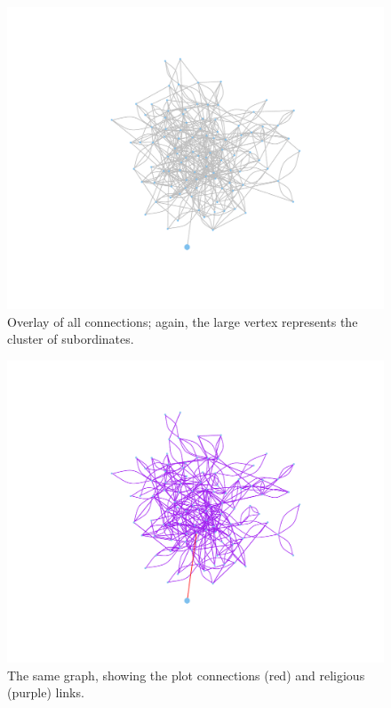 \documentclass{article}
\newenvironment{rnwfig}[0]{\begin{figure}\begin{center}}{\end{center}\end{figure}}
\begin{document}
\begin{rnwfig}
\includegraphics{manuscript-allAlt}
\caption{Overlay of all connections; again, the large vertex represents the cluster of subordinates.}
\end{rnwfig}

\begin{rnwfig}
\includegraphics{manuscript-religionAlt}
\caption{The same graph, showing the plot connections (red) and religious (purple) links.}
\end{rnwfig}
\end{document}
